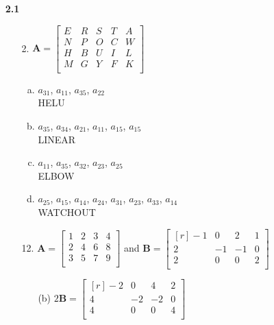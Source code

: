 \documentclass[letterpaper,fleqn]{article}
\begin{document}
	\begin{enumerate}
		\item [\textbf{2.1}] \quad
		\begin{enumerate}
			\item [2.] 
			$\textbf{A}=\begin{bmatrix}
				E & R & S & T & A \\
				N & P & O & C & W \\
				H & B & U & I & L \\
				M & G & Y & F & K \\
			\end{bmatrix}$
			\begin{enumerate}[(a)]
				\item
				$a_{31}$, $a_{11}$, $a_{35}$, $a_{22}$ \\
				HELU
				
				\item
				$a_{35}$, $a_{34}$, $a_{21}$, $a_{11}$, $a_{15}$, $a_{15}$ \\
				LINEAR
				
				\item
				$a_{11}$, $a_{35}$, $a_{32}$, $a_{23}$, $a_{25}$ \\
				ELBOW 
				
				\item
				$a_{25}$, $a_{15}$, $a_{14}$, $a_{24}$, $a_{31}$, $a_{23}$, $a_{33}$, $a_{14}$ \\
				WATCHOUT
			\end{enumerate} 
									
			\item [12.]
			$\textbf{A}=\begin{bmatrix}
				1 & 2 & 3 & 4 \\
				2 & 4 & 6 & 8 \\
				3 & 5 & 7 & 9 \\
			\end{bmatrix}$ and $\textbf{B}=\begin{bmatrix*}[r]
				-1 & 0 & 2 & 1 \\
				2 & -1 & -1 & 0 \\
				2 & 0 & 0 & 2 \\
			\end{bmatrix*}$
			\begin{enumerate}
				\item [(b)]
				$2\textbf{B}=\begin{bmatrix*}[r]
					-2 & 0 & 4 & 2 \\
					4 & -2 & -2 & 0 \\
					4 & 0 & 0 & 4 \\
				\end{bmatrix*}$
				

\end{enumerate}
\end{enumerate}
\end{enumerate}
\end{document}
